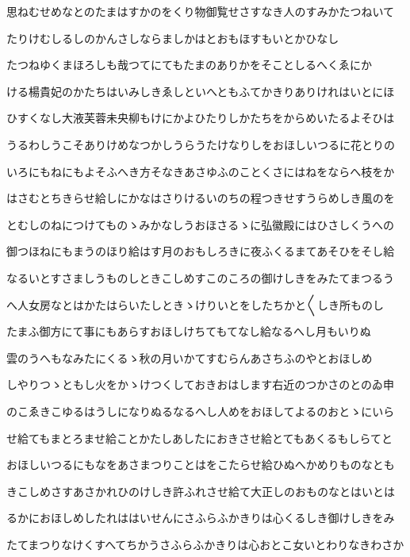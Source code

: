 \documentclass[a4paper,11pt,landscape]{ltjtarticle}
\begin{document}
\par\medskip
思ねむせめなとのたまはすかのをくり物御覧せさすなき人のすみかたつねいて
\par\medskip
たりけむしるしのかんさしならましかはとおもほすもいとかひなし
\par\medskip
たつねゆくまほろしも哉つてにてもたまのありかをそことしるへくゑにか
\par\medskip
ける楊貴妃のかたちはいみしきゑしといへともふてかきりありけれはいとにほ
\par\medskip
ひすくなし大液芙蓉未央柳もけにかよひたりしかたちをからめいたるよそひは
\par\medskip
うるわしうこそありけめなつかしうらうたけなりしをおほしいつるに花とりの
\par\medskip
いろにもねにもよそふへき方そなきあさゆふのことくさにはねをならへ枝をか
\par\medskip
はさむとちきらせ給しにかなはさりけるいのちの程つきせすうらめしき風のを
\par\medskip
とむしのねにつけてものゝみかなしうおほさるゝに弘徽殿にはひさしくうへの
\par\medskip
御つほねにもまうのほり給はす月のおもしろきに夜ふくるまてあそひをそし給
\par\medskip
なるいとすさましうものしときこしめすこのころの御けしきをみたてまつるう
\par\medskip
へ人女房なとはかたはらいたしときゝけりいとをしたちかと〱しき所ものし
\par\medskip
たまふ御方にて事にもあらすおほしけちてもてなし給なるへし月もいりぬ
\par\medskip
雲のうへもなみたにくるゝ秋の月いかてすむらんあさちふのやとおほしめ
\par\medskip
しやりつゝともし火をかゝけつくしておきおはします右近のつかさのとのゐ申
\par\medskip
のこゑきこゆるはうしになりぬるなるへし人めをおほしてよるのおとゝにいら
\par\medskip
せ給てもまとろませ給ことかたしあしたにおきさせ給とてもあくるもしらてと
\par\medskip
おほしいつるにもなをあさまつりことはをこたらせ給ひぬへかめりものなとも
\par\medskip
きこしめさすあさかれひのけしき許ふれさせ給て大正しのおものなとはいとは
\par\medskip
るかにおほしめしたれははいせんにさふらふかきりは心くるしき御けしきをみ
\par\medskip
たてまつりなけくすへてちかうさふらふかきりは心おとこ女いとわりなきわさか
\par\medskip
\end{document}
